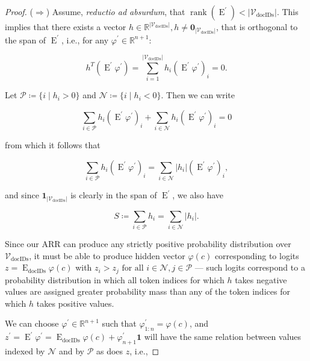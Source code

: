 \documentclass[11pt, a4paper, onecolumn, confidential, copyright, gdm]{google}
\newcommand{\Edocids}{\operatorname{E}_{\text{docIDs}}}
\newcommand{\Eprime}{\operatorname{E}^{\prime}}
\newcommand{\Vdocids}{\mathscr{V}_{\text{docIDs}}}
\begin{document}
\begin{proof}
($\Rightarrow$) Assume, \textit{reductio ad absurdum}, that $\operatorname{rank}(\Eprime) < |\Vdocids|$. This implies that there exists a vector $h \in \mathbb{R}^{|\Vdocids|}, h \neq \mathbf{0}_{|\Vdocids|}$, that is orthogonal to the span of $\Eprime$, i.e., for any $\varphi^\prime \in \mathbb{R}^{n+1}$: 

\begin{equation}\label{eq:dot-product-0-original}
h^T(\Eprime \varphi^\prime) = \sum_{i=1}^{|\Vdocids|}h_i(\Eprime \varphi^\prime)_i = 0.
\end{equation}

\noindent Let $\mathcal P \coloneqq \{i \mid h_i > 0\}$ and $\mathcal N \coloneqq \{i \mid h_i < 0\}$. Then we can write

\begin{equation}\label{eq:dot-product-0-decomposed}
\sum_{i \in \mathcal P}h_i(\Eprime \varphi^\prime)_i + \sum_{i \in \mathcal N}h_i(\Eprime \varphi^\prime)_i = 0
\end{equation}

\noindent from which it follows that

\begin{equation}\label{eq:dot-product-equality}
\sum_{i \in \mathcal{P}}h_i(\Eprime \varphi^\prime)_i = \sum_{i \in \mathcal N}|h_i|(\Eprime \varphi^\prime)_i,
\end{equation}

\noindent and since $\mathbf{1}_{|\Vdocids|}$ is clearly in the span of $\Eprime$, we also have

\begin{equation}\label{eq:dot-product-equality-S}
S \coloneqq \sum_{i \in \mathcal{P}}h_i = \sum_{i \in \mathcal{N}}|h_i|.
\end{equation}

Since our ARR can produce any strictly positive probability distribution over $\Vdocids$, it must be able to produce hidden vector $\varphi(c)$ corresponding to logits $z = \Edocids\varphi(c)$ with $z_i > z_j \text{ for all } i \in \mathcal N, j \in \mathcal P$ — such logits correspond to a probability distribution in which all token indices for which $h$ takes negative values are assigned greater probability mass than any of the token indices for which $h$ takes positive values.

We can choose $\varphi^\prime \in \mathbb{R}^{n+1}$ such that $\varphi^\prime_{1:n} = \varphi(c)$, and $z^\prime = \Eprime \varphi^\prime = \Edocids\varphi(c) + \varphi^\prime_{n+1}\mathbf{1}$ will have the same relation between values indexed by $\mathcal N$ and by $\mathcal P$ as does $z$, i.e.,


\end{proof}
\end{document}
